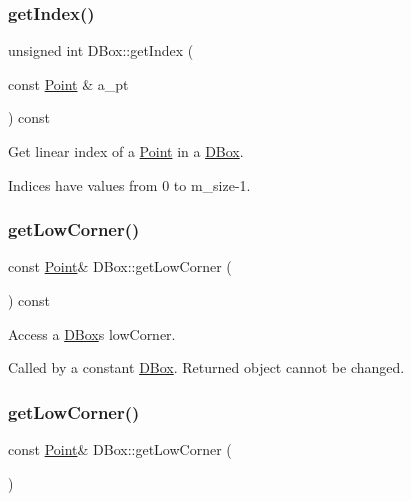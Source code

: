 \subsubsection{\texorpdfstring{get\+Index()}{getIndex()}}
{\footnotesize\ttfamily unsigned int D\+Box\+::get\+Index (\begin{DoxyParamCaption}\item[{const \hyperlink{class_point}{Point} \&}]{a\+\_\+pt }\end{DoxyParamCaption}) const\hspace{0.3cm}{\ttfamily [inline]}}



Get linear index of a \hyperlink{class_point}{Point} in a \hyperlink{class_d_box}{D\+Box}. 

Indices have values from 0 to m\+\_\+size-\/1. \mbox{\label{class_d_box_a15d019841f673b3c170d641706ee07d3}} 
\subsubsection{\texorpdfstring{get\+Low\+Corner()}{getLowCorner()}\hspace{0.1cm}{\footnotesize\ttfamily [1/2]}}
{\footnotesize\ttfamily const \hyperlink{class_point}{Point}\& D\+Box\+::get\+Low\+Corner (\begin{DoxyParamCaption}{ }\end{DoxyParamCaption}) const\hspace{0.3cm}{\ttfamily [inline]}}



Access a \hyperlink{class_d_box}{D\+Box}\textquotesingle{}s low\+Corner. 

Called by a constant \hyperlink{class_d_box}{D\+Box}. Returned object cannot be changed. \mbox{\label{class_d_box_ab83ccd62bdb4c44e60027c6e745813f2}} 
\subsubsection{\texorpdfstring{get\+Low\+Corner()}{getLowCorner()}\hspace{0.1cm}{\footnotesize\ttfamily [2/2]}}
{\footnotesize\ttfamily const \hyperlink{class_point}{Point}\& D\+Box\+::get\+Low\+Corner (\begin{DoxyParamCaption}{ }\end{DoxyParamCaption})\hspace{0.3cm}{\ttfamily [inline]}}



